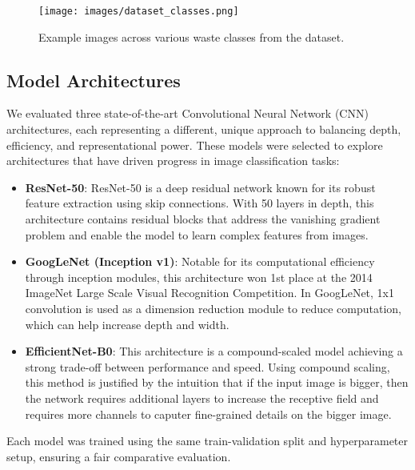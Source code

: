 \documentclass[11pt,twocolumn]{article}
\begin{document}
\begin{figure}[h]
    \centering
    \texttt{[image: images/dataset\_classes.png]}
    \caption{Example images across various waste classes from the dataset.}
    \label{fig:dataset}
\end{figure}

\subsection{Model Architectures}
We evaluated three state-of-the-art Convolutional Neural Network (CNN) architectures, each representing a different, unique approach to balancing depth, efficiency, and representational power. These models were selected to explore architectures that have driven progress in image classification tasks:
\begin{itemize}
    \item \textbf{ResNet-50}: ResNet-50 is a deep residual network known for its robust feature extraction using skip connections. With 50 layers in depth, this architecture contains residual blocks that address the vanishing gradient problem and enable the model to learn complex features from images.
    \item \textbf{GoogLeNet (Inception v1)}: Notable for its computational efficiency through inception modules, this architecture won 1st place at the 2014 ImageNet Large Scale Visual Recognition Competition. In GoogLeNet, 1x1 convolution is used as a dimension reduction module to reduce computation, which can help increase depth and width. 
    \item \textbf{EfficientNet-B0}: This architecture is a compound-scaled model achieving a strong trade-off between performance and speed. Using compound scaling, this method is justified by the intuition that if the input image is bigger, then the network requires additional layers to increase the receptive field and requires more channels to caputer fine-grained details on the bigger image. 
\end{itemize}

Each model was trained using the same train-validation split and hyperparameter setup, ensuring a fair comparative evaluation.

\end{document}
